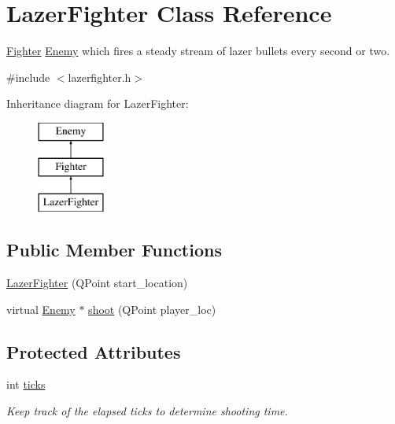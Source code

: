 \hypertarget{classLazerFighter}{
\section{LazerFighter Class Reference}
\label{classLazerFighter}
}


\hyperlink{classFighter}{Fighter} \hyperlink{classEnemy}{Enemy} which fires a steady stream of lazer bullets every second or two.  




{\ttfamily \#include $<$lazerfighter.h$>$}

Inheritance diagram for LazerFighter:\begin{figure}[H]
\begin{center}
\leavevmode
\includegraphics[height=3.000000cm]{classLazerFighter}
\end{center}
\end{figure}
\subsection*{Public Member Functions}
\begin{DoxyCompactItemize}
\item 
\hyperlink{classLazerFighter_a0dec8cfc6b69dd5961f2931ac92cabce}{LazerFighter} (QPoint start\_\-location)
\item 
virtual \hyperlink{classEnemy}{Enemy} $\ast$ \hyperlink{classLazerFighter_a8249d95ea87e414c34c56ada5d1f8689}{shoot} (QPoint player\_\-loc)
\end{DoxyCompactItemize}
\subsection*{Protected Attributes}
\begin{DoxyCompactItemize}
\item 
\hypertarget{classLazerFighter_abc4f183e1672142c2ea28102fa20c109}{
int \hyperlink{classLazerFighter_abc4f183e1672142c2ea28102fa20c109}{ticks}}
\label{classLazerFighter_abc4f183e1672142c2ea28102fa20c109}

\begin{DoxyCompactList}\small\item\em Keep track of the elapsed ticks to determine shooting time. \end{DoxyCompactList}\end{DoxyCompactItemize}


